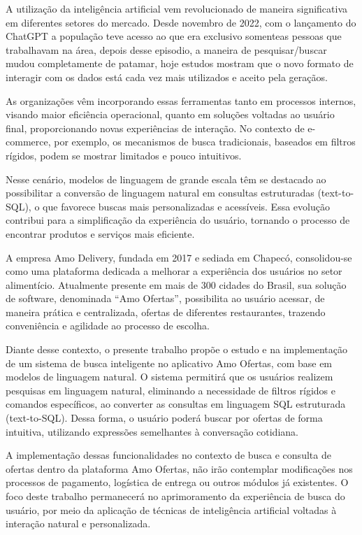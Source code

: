 \label{cap:introducao}

A utilização da inteligência artificial  vem revolucionado de maneira significativa em diferentes setores do mercado. Desde novembro de 2022, com o lançamento
do ChatGPT a população teve acesso ao que era exclusivo somenteas pessoas que trabalhavam na área, depois desse episodio, a maneira de pesquisar/buscar mudou completamente de 
patamar, hoje estudos mostram que o novo formato de interagir com os dados está cada vez mais utilizados e aceito pela geraçãos. 

As organizações vêm incorporando essas ferramentas tanto em processos internos, 
visando maior eficiência operacional, quanto em soluções voltadas ao usuário final, proporcionando novas experiências de interação.
No contexto de e-commerce, por exemplo, os mecanismos de busca tradicionais, baseados em filtros rígidos, podem se mostrar limitados e pouco intuitivos.

Nesse cenário, modelos de linguagem de grande escala  têm se destacado ao possibilitar a conversão de linguagem natural em consultas estruturadas (text-to-SQL), 
o que favorece buscas mais personalizadas e acessíveis. Essa evolução contribui para a simplificação da experiência do usuário, tornando o processo de encontrar produtos e serviços mais eficiente. 

A empresa Amo Delivery, fundada em 2017 e sediada em Chapecó, consolidou-se como uma plataforma dedicada a melhorar a experiência dos usuários no setor alimentício. 
Atualmente presente em mais de 300 cidades do Brasil, sua solução de software, denominada “Amo Ofertas”, possibilita ao usuário acessar, de maneira prática e centralizada, 
ofertas de diferentes restaurantes, trazendo conveniência e agilidade ao processo de escolha.

Diante desse contexto, o presente trabalho propõe o estudo e na implementação de um sistema de busca inteligente no aplicativo Amo Ofertas, com base em modelos de linguagem natural. 
O sistema permitirá que os usuários realizem pesquisas em linguagem natural, eliminando a necessidade de filtros rígidos e comandos específicos, ao converter as consultas em 
linguagem SQL estruturada (text-to-SQL). Dessa forma, o usuário poderá buscar por ofertas de forma intuitiva, utilizando expressões semelhantes à conversação cotidiana.

A implementação dessas funcionalidades no contexto de busca e consulta de ofertas dentro da plataforma Amo Ofertas, 
não irão contemplar modificações nos processos de pagamento, logística de entrega ou outros módulos já existentes. O foco deste trabalho 
permanecerá no aprimoramento da experiência de busca do usuário, por meio da aplicação de técnicas de 
inteligência artificial voltadas à interação natural e personalizada.



